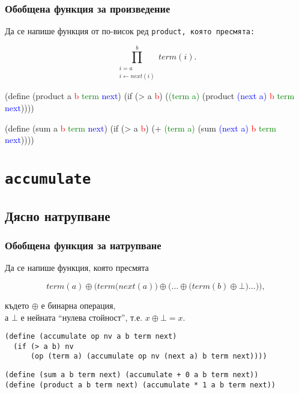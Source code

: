 \documentclass{beamer}
\begin{document}
\begin{frame}[fragile]
  \frametitle{Обобщена функция за произведение}
  Да се напише функция от по-висок ред \tt{product}, която пресмята:

  \begin{equation*}
    \prod_{\substack{i=a \\i \leftarrow next(i)}}^b term(i).
  \end{equation*}

\pause

\newcommand{\fb}{\only<4>\fbox}

\begin{semiverbatim}
(define (product a \textcolor{red}b \textcolor{green}{term} \textcolor{blue}{next})
  (if (> a \textcolor{red}b) \fb1 (\fb* \textcolor{green}{(term a)} (product \textcolor{blue}{(next a)} \textcolor{red}b \textcolor{green}{term} \textcolor{blue}{next}))))
\end{semiverbatim}

\pause

\begin{semiverbatim}
(define (sum a \textcolor{red}b \textcolor{green}{term} \textcolor{blue}{next})
  (if (> a \textcolor{red}b) \fb0 (\fb+ \textcolor{green}{(term a)} (sum \textcolor{blue}{(next a)} \textcolor{red}b \textcolor{green}{term} \textcolor{blue}{next}))))
\end{semiverbatim}

\end{frame}

\section{\tt{accumulate}}

\subsection{Дясно натрупване}

\begin{frame}[fragile]
  \frametitle{Обобщена функция за натрупване}

  Да се напише функция, която пресмята

  \begin{equation*}
    term(a) \oplus \bigg(term\big(next(a)\big) \oplus \Big(\ldots \oplus \big(term(b) \oplus \bot\big) \ldots\Big)\bigg),
  \end{equation*}

  където $\oplus$ е бинарна операция,\\
  а $\bot$ е нейната ``нулева стойност'', т.е. $x\oplus\bot = x$.

  \pause
\small
\begin{verbatim}
(define (accumulate op nv a b term next)
  (if (> a b) nv
      (op (term a) (accumulate op nv (next a) b term next))))
\end{verbatim}
\pause
\begin{verbatim}
(define (sum a b term next) (accumulate + 0 a b term next))
(define (product a b term next) (accumulate * 1 a b term next))
\end{verbatim}
\end{frame}
\end{document}
